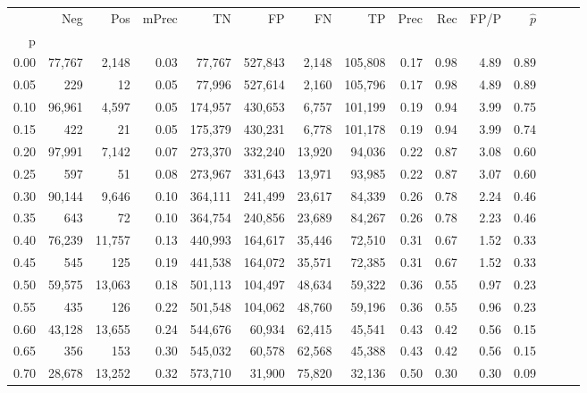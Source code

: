 \begin{tabular}{rrrrrrrrrrrrrrr}
\toprule
{} &     Neg &     Pos & mPrec &       TN &       FP &       FN &       TP &  Prec &   Rec &  FP/P & $\hat{p}$ \\
p    &         &         &       &          &          &          &          &       &       &       &           \\
\midrule
0.00 &  77,767 &   2,148 &  0.03 &   77,767 &  527,843 &    2,148 &  105,808 &  0.17 &  0.98 &  4.89 &      0.89 \\
0.05 &     229 &      12 &  0.05 &   77,996 &  527,614 &    2,160 &  105,796 &  0.17 &  0.98 &  4.89 &      0.89 \\
0.10 &  96,961 &   4,597 &  0.05 &  174,957 &  430,653 &    6,757 &  101,199 &  0.19 &  0.94 &  3.99 &      0.75 \\
0.15 &     422 &      21 &  0.05 &  175,379 &  430,231 &    6,778 &  101,178 &  0.19 &  0.94 &  3.99 &      0.74 \\
0.20 &  97,991 &   7,142 &  0.07 &  273,370 &  332,240 &   13,920 &   94,036 &  0.22 &  0.87 &  3.08 &      0.60 \\
0.25 &     597 &      51 &  0.08 &  273,967 &  331,643 &   13,971 &   93,985 &  0.22 &  0.87 &  3.07 &      0.60 \\
0.30 &  90,144 &   9,646 &  0.10 &  364,111 &  241,499 &   23,617 &   84,339 &  0.26 &  0.78 &  2.24 &      0.46 \\
0.35 &     643 &      72 &  0.10 &  364,754 &  240,856 &   23,689 &   84,267 &  0.26 &  0.78 &  2.23 &      0.46 \\
0.40 &  76,239 &  11,757 &  0.13 &  440,993 &  164,617 &   35,446 &   72,510 &  0.31 &  0.67 &  1.52 &      0.33 \\
0.45 &     545 &     125 &  0.19 &  441,538 &  164,072 &   35,571 &   72,385 &  0.31 &  0.67 &  1.52 &      0.33 \\
0.50 &  59,575 &  13,063 &  0.18 &  501,113 &  104,497 &   48,634 &   59,322 &  0.36 &  0.55 &  0.97 &      0.23 \\
0.55 &     435 &     126 &  0.22 &  501,548 &  104,062 &   48,760 &   59,196 &  0.36 &  0.55 &  0.96 &      0.23 \\
0.60 &  43,128 &  13,655 &  0.24 &  544,676 &   60,934 &   62,415 &   45,541 &  0.43 &  0.42 &  0.56 &      0.15 \\
0.65 &     356 &     153 &  0.30 &  545,032 &   60,578 &   62,568 &   45,388 &  0.43 &  0.42 &  0.56 &      0.15 \\
0.70 &  28,678 &  13,252 &  0.32 &  573,710 &   31,900 &   75,820 &   32,136 &  0.50 &  0.30 &  0.30 &      0.09 \\

\end{tabular}
